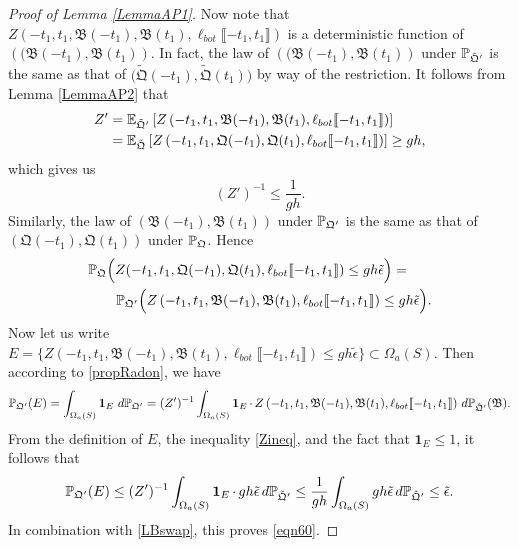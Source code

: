 \begin{proof}[Proof of Lemma \ref{LemmaAP1}]
	Now note that $Z\left(-t_1, t_1, \mathfrak B(-t_1), \mathfrak B(t_1), \ell_{bot}\llbracket -t_1, t_1\rrbracket\right)$ is a deterministic function of $\left((\mathfrak B(-t_1), \mathfrak B(t_1)\right)$. In fact, the law of $\left((\mathfrak B(-t_1), \mathfrak B(t_1)\right)$ under $\mathbb{P}_{\tilde{\mathfrak{Q}}'}$ is the same as that of $\big(\tilde{\mathfrak{Q}}(-t_1), \tilde{\mathfrak{Q}}(t_1)\big)$ by way of the restriction. It follows from Lemma \ref{LemmaAP2} that
	\begin{align*}
		Z' &= \mathbb{E}_{\tilde{\mathfrak{Q}}'}\left[Z\left(-t_1, t_1, \mathfrak B(-t_1), \mathfrak B(t_1), \ell_{bot}\llbracket -t_1, t_1\rrbracket\right)\right]\\
		&= \mathbb{E}_{\tilde{\mathfrak{Q}}}\left[Z\left(-t_1, t_1, \mathfrak{Q}(-t_1), \mathfrak{Q}(t_1), \ell_{bot}\llbracket -t_1, t_1\rrbracket\right)\right]\geq gh,
	\end{align*}	
	which gives us 
	\begin{equation}
		\label{Zineq} (Z')^{-1}\leq \frac{1}{gh}.
	\end{equation}
	Similarly,  the law of $\left(\mathfrak B(-t_1), \mathfrak{B}(t_1)\right)$ under $\mathbb{P}_{\mathfrak{Q}'}$ is the same as that of $\left(\mathfrak{Q}(-t_1), \mathfrak{Q}(t_1)\right)$ under $\mathbb{P}_{\mathfrak{Q}}$. Hence
	\begin{equation}\label{LBswap}
		\begin{split}
			&\mathbb{P}_{\mathfrak{Q}}\Big(Z(-t_1, t_1, \mathfrak{Q}(-t_1), \mathfrak{Q}(t_1), \ell_{bot}\llbracket -t_1, t_1\rrbracket)\leq gh\tilde \epsilon\Big)=\\
			&\qquad\mathbb{P}_{\mathfrak{Q}'}\Big(Z\left(-t_1, t_1, \mathfrak B(-t_1), \mathfrak B(t_1), \ell_{bot}\llbracket -t_1, t_1\rrbracket\right)\leq gh\tilde \epsilon\Big).
		\end{split}
	\end{equation}
	Now let us write $E=\{Z\left(-t_1, t_1, \mathfrak B(-t_1), \mathfrak B(t_1), \ell_{bot}\llbracket -t_1, t_1\rrbracket\right)\leq gh\tilde\epsilon\}\subset \Omega_a(S)$. Then according to \eqref{propRadon}, we have
	\[
	\mathbb{P}_{\mathfrak{Q}'}(E)=\int_{\Omega_a(S)} \operatorname{\mathbf{1}}_E\, d\mathbb{P}_{\mathfrak{Q}'} = (Z')^{-1}\int_{\Omega_a(S)}\operatorname{\mathbf{1}}_E \cdot\, Z\left(-t_1, t_1, \mathfrak B(-t_1), \mathfrak B(t_1), \ell_{bot}\llbracket -t_1, t_1\rrbracket\right)\, d\mathbb{P}_{\tilde{\mathfrak{Q}}'}(\mathfrak{B}).
	\]
	From the definition of $E$, the inequality \eqref{Zineq}, and the fact that $\mathbf{1}_E \leq 1$, it follows that
	\[
	\mathbb{P}_{\mathfrak{Q}'}(E)\leq (Z')^{-1}\int_{\Omega_a(S)} \operatorname{\mathbf{1}}_E\cdot\, gh\tilde{\epsilon}\, d\mathbb{P}_{\tilde{\mathfrak{Q}}'} \leq \frac{1}{gh}\int_{\Omega_a(S)} gh\tilde\epsilon\, d\mathbb{P}_{\tilde{\mathfrak{Q}}'}\leq \tilde{\epsilon}.
	\]
	In combination with \eqref{LBswap}, this proves \eqref{eqn60}.
	
\end{proof}
